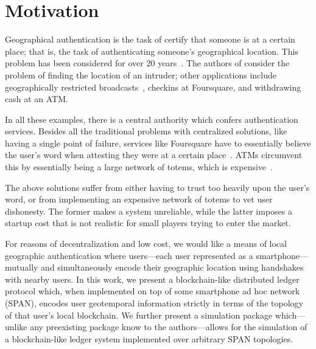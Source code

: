 \section{Motivation}

Geographical authentication
is the task of certify that someone is at a certain place;
that is,
the task of authenticating someone's geographical location.
This problem has been considered for over 20 years~\cite{denning_1996}.
The authors of \cite{denning_1996} consider the problem of finding
the location of an intruder;
other applications include geographically restricted broadcasts~\cite{gdpr},
checkins at Foursquare,
and withdrawing cash at an ATM.

In all these examples,
there is a central authority which confers authentication services.
Besides all the traditional problems with centralized solutions,
like having a single point of failure,
services like Foursquare have to essentially believe the user's word
when attesting they were at a certain place~\cite{glas2015breaking}.
ATMs circumvent this by essentially being a large network of totems,
which is expensive~\cite{totem_patent}.

The above solutions suffer from either having to trust too heavily upon
the user's word, or from implementing an expensive network of totems to
vet user dishonesty. The former makes a system unreliable, while the latter
imposes a startup cost that is not realistic for small players trying to enter
the market.

For reasons of decentralization and low cost, we would like a
means of local geographic authentication where users---each user represented as
a smartphone---mutually and simultaneously encode their geographic location using
handshakes with nearby users.
In this work,
we present a blockchain-like distributed ledger protocol which,
when implemented on top of some
smartphone ad hoc network (SPAN), encodes user geotemporal information strictly in
terms of the topology of that user's local blockchain. We further present a simulation
package which---unlike any preexisting package know to the authors---allows for the
simulation of a blockchain-like ledger system implemented over arbitrary SPAN
topologies.
